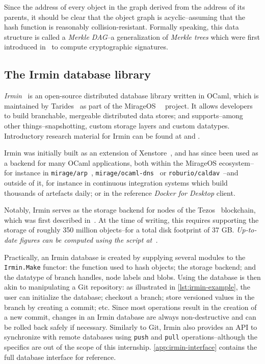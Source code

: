 \bigskip
Since the address of every object in the graph derived from the address of its parents, it should be clear that the object graph is acyclic--assuming that the hash function is reasonably collision-resistant. Formally speaking, this data structure is called a \emph{Merkle DAG}--a generalization of \emph{Merkle trees} which were first introduced in~\cite{merkle88} to compute cryptographic signatures.

\subsection{The Irmin database library}

\emph{Irmin}~\cite{irmin} is an open-source distributed
database library written in OCaml, which is maintained by Tarides~\cite{tarides} as part of the MirageOS~\cite{mirage}~\cite{mirage-paper} project. It allows developers to build branchable, mergeable distributed data stores; and supports--among other things--snapshotting, custom storage layers and custom datatypes. Introductory research material for Irmin can be found at \cite{irmin15} and \cite{irmin19}.

Irmin was initially built as an extension of Xenstore~\cite{xenstore}, and has since been used as a backend for many OCaml applications, both within the MirageOS ecosystem--for instance in \texttt{mirage/arp}~\cite{mirage-arp}, \texttt{mirage/ocaml-dns}~\cite{mirage-dns} or \texttt{roburio/caldav}~\cite{roburio-caldav}--and outside of it, for instance in continuous integration systems which build thousands of artefacts daily; or in the reference \emph{Docker for Desktop} client.

Notably, Irmin serves as the storage backend for nodes of the Tezos~\cite{tezos} blockchain, which was first described in~\cite{tezos14}. At the time of writing, this requires supporting the storage of roughly 350 million objects--for a total disk footprint of 37 GB. \emph{Up-to-date figures can be computed using the script at~\cite{tree-statistics}.}

Practically, an Irmin database is created by supplying several modules to the \texttt{Irmin.Make} functor: the function used to hash objects; the storage backend; and the datatype of branch handles, node labels and blobs. Using the database is then akin to manipulating a Git repository: as illustrated in \cref{lst:irmin-example}, the user can initialize the database; checkout a branch; store versioned values in the branch by creating a commit; etc. Since most operations result in the creation of a new commit, changes in an Irmin database are always non-destructive and can be rolled back safely if necessary. Similarly to Git, Irmin also provides an API to synchronize with remote databases using \texttt{push} and \texttt{pull} operations--although the specifics are out of the scope of this internship. \cref{app:irmin-interface} contains the full database interface for reference.

